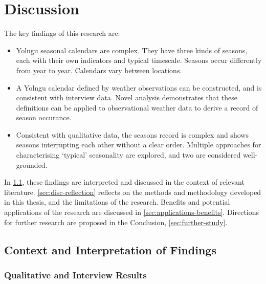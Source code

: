 \chapter{Discussion}
\label{ch:discussion}

The key findings of this research are:
\begin{itemize}
\item Yolngu seasonal calendars are complex.  They have three kinds of
    seasons, each with their own indicators and typical timescale.  Seasons
    occur differently from year to year.  Calendars vary between locations.

\item A Yolngu calendar defined by weather observations can be constructed,
    and is consistent with interview data.  Novel analysis demonstrates that
    these definitions can be applied to observational weather data to derive
    a record of season occurance.

\item Consistent with qualitative data, the seasons record is complex and
    shows seasons interrupting each other without a clear order.  Multiple
    approaches for characterising `typical' seasonality are explored, and
    two are considered well-grounded.

\end{itemize}

In \cref{sec:disc-results}, these findings are interpreted and discussed in
the context of relevant literature.  \cref{sec:disc-reflection} reflects on
the methods and methodology developed in this thesis, and the limitations
of the research.  Benefits and potential applications of the research are
discussed in \cref{sec:applications-benefits}.  Directions for further
research are proposed in the Conclusion, \cref{sec:further-study}.




\section{Context and Interpretation of Findings}
\label{sec:disc-results}

\subsection{Qualitative and Interview Results}

